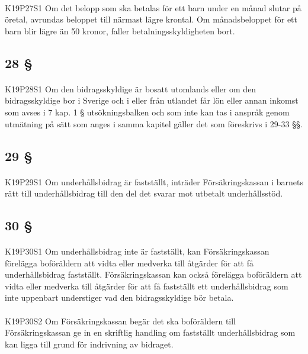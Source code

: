 \documentclass[a4paper,notitlepage,openany,10pt]{book}
\begin{document}
\paragraph*{}
{\tiny K19P27S1}
Om det belopp som ska betalas för ett barn under en månad slutar på öretal, avrundas beloppet till närmast lägre krontal. Om månadsbeloppet för ett barn blir lägre än 50 kronor, faller betalningsskyldigheten bort.
\subsection*{28 §}
\paragraph*{}
{\tiny K19P28S1}
Om den bidragsskyldige är bosatt utomlands eller om den bidragsskyldige bor i Sverige och i eller från utlandet får lön eller annan inkomst som avses i 7 kap. 1 § utsökningsbalken och som inte kan tas i anspråk genom utmätning på sätt som anges i samma kapitel gäller det som föreskrivs i 29-33 §§.
\subsection*{29 §}
\paragraph*{}
{\tiny K19P29S1}
Om underhållsbidrag är fastställt, inträder Försäkringskassan i barnets rätt till underhållsbidrag till den del det svarar mot utbetalt underhållsstöd.
\subsection*{30 §}
\paragraph*{}
{\tiny K19P30S1}
Om underhållsbidrag inte är fastställt, kan Försäkringskassan förelägga boföräldern att vidta eller medverka till åtgärder för att få underhållsbidrag fastställt. Försäkringskassan kan också förelägga boföräldern att vidta eller medverka till åtgärder för att få fastställt ett underhållsbidrag som inte uppenbart understiger vad den bidragsskyldige bör betala.
\paragraph*{}
{\tiny K19P30S2}
Om Försäkringskassan begär det ska boföräldern till Försäkringskassan ge in en skriftlig handling om fastställt underhållsbidrag som kan ligga till grund för indrivning av bidraget.
\end{document}
